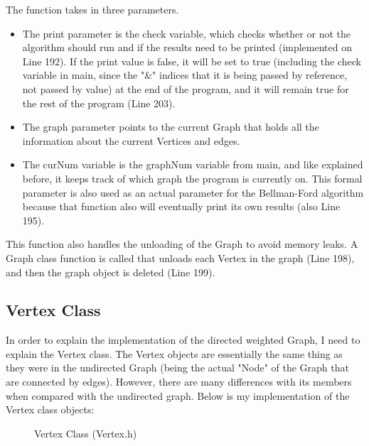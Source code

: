 \documentclass[letterpaper, 10pt]{article}
\begin{document}
\noindent
The function takes in three parameters.
\begin{itemize}
    \item The print parameter is the check variable, which checks whether or not the algorithm should run and if the results need to be printed (implemented on Line 192). If the print value is false, it will be set to true (including the check variable in main, since the "\&" indices that it is being passed by reference, not passed by value) at the end of the program, and it will remain true for the rest of the program (Line 203).
    \item The graph parameter points to the current Graph that holds all the information about the current Vertices and edges.
    \item The curNum variable is the graphNum variable from main, and like explained before, it keeps track of which graph the program is currently on. This formal parameter is also used as an actual parameter for the Bellman-Ford algorithm because that function also will eventually print its own results (also Line 195). 
\end{itemize}

\noindent
This function also handles the unloading of the Graph to avoid memory leaks. A Graph class function is called that unloads each Vertex in the graph (Line 198), and then the graph object is deleted (Line 199).

\subsection{Vertex Class}
\vspace{-0.5em}
\noindent
In order to explain the implementation of the directed weighted Graph, I need to explain the Vertex class. The Vertex objects are essentially the same thing as they were in the undirected Graph (being the actual "Node" of the Graph that are connected by edges). However, there are many differences with its members when compared with the undirected graph. Below is my implementation of the Vertex class objects:

\vspace{-1em}
\begin{figure}[H]
  \centering
   
  \label{fig:figure2.4-part1}
\end{figure}

\vspace{-1em}
\begin{figure}[H]
  \centering
   
  \caption{Vertex Class (Vertex.h)}
  \label{fig:figure2.4-part2}
\end{figure}
\end{document}
